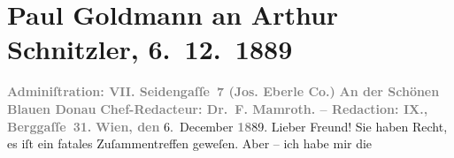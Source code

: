 

         
         \renewcommand{\erwaehntePersonen}{Personen:  ?? [Frau, die mit Goldmann in der Straßenbahn spricht, Ende November 1889],  ?? [Mann, der Gespräch über Schnitzler in der Straßenbahn belauscht, Ende November 1889], Paul Goldmann, Fedor Mamroth}
         \renewcommand{\erwaehnteInstitutionen}{Institutionen: An der schönen blauen Donau, Josef Eberle Stein-, Buch und Musikaliendruckerei}
         \renewcommand{\erwaehnteOrte}{Orte: Berggasse, Seidengasse, Wien}
         \renewcommand{\erwaehnteWerke}{}
               \section[Paul Goldmann an Arthur Schnitzler, 6. 12. 1889]{ Paul Goldmann an Arthur Schnitzler, 6. 12. 1889}\nopagebreak{}\rehead{ }\begin{ledgroupsized}[t]{13cm}\normalsize\beginnumbering{} \toendnotes[C]{\smallbreak\pagebreak[2]} 
\toendnotes[C]{\smallbreak}\pstart
           \noindent{}\centering{}{\pb}\textcolor{gray}{\textbf{\textbf{Adminiſtration: VII.
                           Seidengaſſe 7} (Jos. Eberle {\kaufmannsund} Co.)}}\pend
           \pstart
           \noindent{}\centering{}\textcolor{gray}{\textbf{An der Schönen Blauen Donau}}\pend
           \pstart
           \noindent{}\centering{}\textcolor{gray}{\textbf{Chef-Redacteur: Dr. F.
                        Mamroth. – Redaction: IX.,
                        Berggaſſe 31.}}\pend
           \pstart
           \raggedleft{}\textcolor{gray}{\textbf{Wien, den}}{ }6. December \textcolor{gray}{\textbf{18}}89.\pend
           \pstart\center{}Lieber Freund!\pend\pstart
           Sie haben Recht, es iſt ein fatales Zuſammentreffen geweſen. Aber – ich habe mir die

\end{ledgroupsized}
